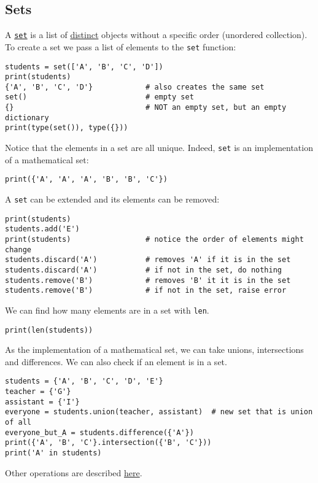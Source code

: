 \documentclass[12pt, a4paper]{article}
\begin{document}
\subsection{Sets}
\label{sec:orgb4dc9ad}
A \href{https://docs.python.org/3.6/library/stdtypes.html\#set}{\texttt{set}} is a list of \uline{distinct} objects without a specific order (unordered collection).
To create a set we pass a list of elements to the \texttt{set} function:
\lstset{language=jupyter-python,label= ,caption= ,captionpos=b,numbers=none}
\begin{lstlisting}
students = set(['A', 'B', 'C', 'D'])
print(students)
{'A', 'B', 'C', 'D'}            # also creates the same set
set()                           # empty set
{}                              # NOT an empty set, but an empty dictionary
print(type(set()), type({}))
\end{lstlisting}

Notice that the elements in a set are all unique. Indeed, \texttt{set} is an implementation of a mathematical set:
\lstset{language=jupyter-python,label= ,caption= ,captionpos=b,numbers=none}
\begin{lstlisting}
print({'A', 'A', 'A', 'B', 'B', 'C'})
\end{lstlisting}

A \texttt{set} can be extended and its elements can be removed:
\lstset{language=jupyter-python,label= ,caption= ,captionpos=b,numbers=none}
\begin{lstlisting}
print(students)
students.add('E')
print(students)                 # notice the order of elements might change
students.discard('A')           # removes 'A' if it is in the set
students.discard('A')           # if not in the set, do nothing
students.remove('B')            # removes 'B' it it is in the set
students.remove('B')            # if not in the set, raise error
\end{lstlisting}

We can find how many elements are in a set with \texttt{len}.
\lstset{language=jupyter-python,label= ,caption= ,captionpos=b,numbers=none}
\begin{lstlisting}
print(len(students))
\end{lstlisting}

As the implementation of a mathematical set, we can take unions, intersections and differences. We can also check if an element is in a set.
\lstset{language=jupyter-python,label= ,caption= ,captionpos=b,numbers=none}
\begin{lstlisting}
students = {'A', 'B', 'C', 'D', 'E'}
teacher = {'G'}
assistant = {'I'}
everyone = students.union(teacher, assistant)  # new set that is union of all
everyone_but_A = students.difference({'A'})
print({'A', 'B', 'C'}.intersection({'B', 'C'}))
print('A' in students)
\end{lstlisting}
Other operations are described \href{https://docs.python.org/3.6/library/stdtypes.html\#set}{here}.
\end{document}
